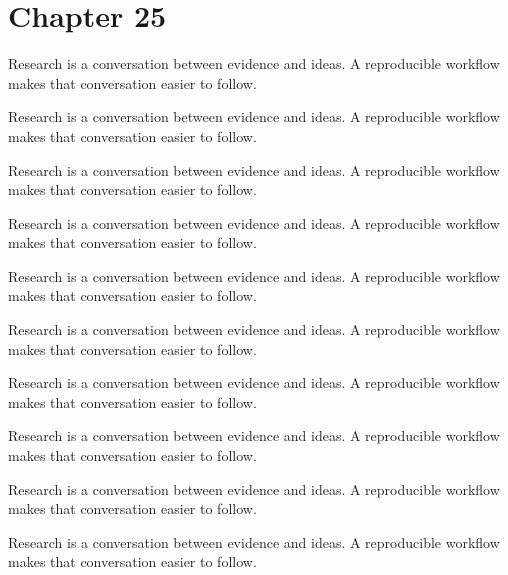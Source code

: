 \section*{Chapter 25}
Research is a conversation between evidence and ideas. A reproducible workflow makes that conversation easier to follow.

Research is a conversation between evidence and ideas. A reproducible workflow makes that conversation easier to follow.

Research is a conversation between evidence and ideas. A reproducible workflow makes that conversation easier to follow.

Research is a conversation between evidence and ideas. A reproducible workflow makes that conversation easier to follow.

Research is a conversation between evidence and ideas. A reproducible workflow makes that conversation easier to follow.

Research is a conversation between evidence and ideas. A reproducible workflow makes that conversation easier to follow.

Research is a conversation between evidence and ideas. A reproducible workflow makes that conversation easier to follow.

Research is a conversation between evidence and ideas. A reproducible workflow makes that conversation easier to follow.

Research is a conversation between evidence and ideas. A reproducible workflow makes that conversation easier to follow.

Research is a conversation between evidence and ideas. A reproducible workflow makes that conversation easier to follow.

\newpage
